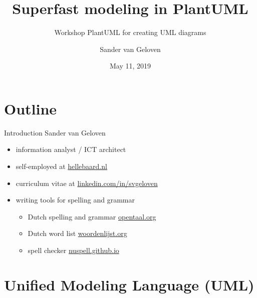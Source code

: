 \documentclass{beamer}
\title{Superfast modeling in PlantUML}
\subtitle{Workshop PlantUML for creating UML diagrams}
\author{Sander van Geloven}
\institute{Hellebaard}
\date{May 11, 2019}
\begin{document}
\begin{frame}
\titlepage
\end{frame}

\begin{frame}
\begin{figure}
\centering
{}
\end{figure}
\end{frame}

\section*{Outline}
\begin{frame}
\tableofcontents
\end{frame}



\begin{frame}{Introduction}
Sander van Geloven
\\\mbox{}
\begin{itemize}
\item information analyst / ICT architect
\\\mbox{}
\item self-employed at \href{http://hellebaard.nl}{hellebaard.nl}
\\\mbox{}
\item curriculum vitae at \href{https://linkedin.com/in/svgeloven}{linkedin.com/in/svgeloven}
\\\mbox{}
\item writing tools for spelling and grammar 
\\\mbox{}
\begin{itemize}
\item Dutch spelling and grammar \href{http://opentaal.org}{opentaal.org}
\item Dutch word list \href{http://woordenlijst.org}{woordenlijst.org}
\item spell checker \href{https://nuspell.github.io}{nuspell.github.io}
\end{itemize}
\end{itemize}
\end{frame}



\section{Unified Modeling Language (UML)}
\end{document}
